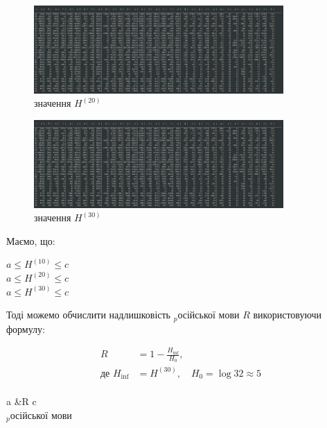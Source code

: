 \documentclass[12pt]{article}
\begin{document}
\begin{figure}[htbp]
    \centering
    \includegraphics[width=0.85\textwidth]{screenshots/bigram_freq_without_space.png}
    \caption{значення \(H^{(20)}\)}
    \label{fig:screenshot}
\end{figure}

\begin{figure}[htbp]
    \centering
    \includegraphics[width=0.85\textwidth]{screenshots/bigram_freq_without_space.png}
    \caption{значення \(H^{(30)}\)}
    \label{fig:screenshot}
\end{figure}

\quad Маємо, що:\\
\begin{center}
$a \leq H^{(10)} \leq c$ \\
$a \leq H^{(20)} \leq c$ \\
$a \leq H^{(30)} \leq c$ \\
\end{center}

Тоді можемо обчислити надлишковість $_{p}$осійської мови \( R \) використовуючи формулу: 

\begin{align*}
R &= 1 - \frac{H_{\text{inf}}}{H_0}, \\
\text{де } H_{\text{inf}} &= H^{(30)}, \quad H_0 = \log 32 \approx 5 \\
\end{align*}

 a &\leq R \leq c \\ 
 $_{p}$осійської мови 
\end{document}

